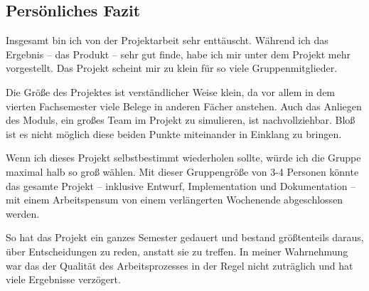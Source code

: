 \subsection{Persönliches Fazit}
Insgesamt bin ich von der Projektarbeit sehr enttäuscht. Während ich das Ergebnis -- das Produkt -- sehr gut finde, habe ich mir unter dem Projekt mehr vorgestellt. Das Projekt scheint mir zu klein für so viele Gruppenmitglieder. 

Die Größe des Projektes ist verständlicher Weise klein, da vor allem in dem vierten Fachsemester viele Belege in anderen Fächer anstehen. Auch das Anliegen des Moduls, ein großes Team im Projekt zu simulieren, ist nachvollziehbar. Bloß ist es nicht möglich diese beiden Punkte miteinander in Einklang zu bringen.

Wenn ich dieses Projekt selbstbestimmt wiederholen sollte, würde ich die Gruppe maximal halb so groß wählen. Mit dieser Gruppengröße von 3-4 Personen könnte das gesamte Projekt -- inklusive Entwurf, Implementation und Dokumentation -- mit einem Arbeitspensum von einem verlängerten Wochenende abgeschlossen werden.

So hat das Projekt ein ganzes Semester gedauert und bestand größtenteils daraus, über Entscheidungen zu reden, anstatt sie zu treffen. In meiner Wahrnehmung war das der Qualität des Arbeitsprozesses in der Regel nicht zuträglich und hat viele Ergebnisse verzögert.\bigskip

